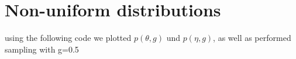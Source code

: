 \section{Non-uniform distributions}
using the following code we plotted $p(\theta,g)$ und $p(\eta,g)$, as well as performed sampling with g=0.5

\begin{figure}[H]
	
\end{figure}